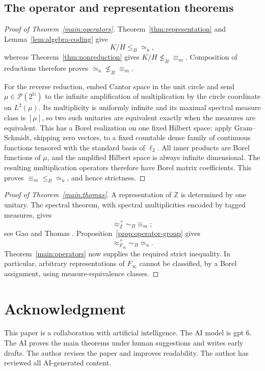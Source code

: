 \documentclass[11pt]{article}
\numberwithin{equation}{section}
\theoremstyle{definition}
\newcommand{\N}{\mathbb N}
\newcommand{\Prob}{\mathcal P}
\newcommand{\leB}{\mathrel{\leq_B}}
\newcommand{\nleB}{\mathrel{\nleq_B}}
\begin{document}
\subsection{The operator and representation theorems}
\begin{proof}[Proof of Theorem~\ref{main:operators}]
Theorem~\ref{thm:representation} and Lemma~\ref{lem:algebra-coding} give
\[
 K/H\leB{\simeq_u},
\]
whereas Theorem~\ref{thm:nonreduction} gives $K/H\nleB{\equiv_m}$.
Composition of reductions therefore proves
$ {\simeq_u}\nleB{\equiv_m}$.

For the reverse reduction, embed Cantor space in the unit circle and
send $\mu\in\Prob(2^\N)$ to the infinite amplification of multiplication
by the circle coordinate on $L^2(\mu)$. Its multiplicity is uniformly
infinite and its maximal spectral measure class is $[\mu]$, so two such
unitaries are equivalent exactly when the measures are equivalent.
This has a Borel realization on one fixed Hilbert space: apply
Gram--Schmidt, skipping zero vectors, to a fixed countable dense family
of continuous functions tensored with the standard basis of $\ell_2$.
All inner products are Borel functions of $\mu$, and the amplified
Hilbert space is always infinite dimensional. The resulting multiplication
operators therefore have Borel matrix coefficients.
This proves $ {\equiv_m}\leB{\simeq_u}$, and hence strictness.
\end{proof}

\begin{proof}[Proof of Theorem~\ref{main:thomas}]
A representation of $\mathbb Z$ is determined by one unitary.
The spectral theorem, with spectral multiplicities encoded by tagged
measures, gives
\[
 {\approx^+_{\mathbb Z}}\sim_B{\equiv_m};
\]
see Gao \cite[Section~8.5, p.~200]{Gao} and Thomas
\cite[Section~8]{Thomas}. Proposition~\ref{prop:operator-group} gives
\[
 {\approx^+_{F_\infty}}\sim_B{\simeq_u}.
\]
Theorem~\ref{main:operators} now supplies the required strict inequality.
In particular, arbitrary representations of $F_\infty$ cannot be
classified, by a Borel assignment, using measure-equivalence classes.
\end{proof}

\section*{Acknowledgment}
This paper is a collaboration with artificial intelligence. The AI model is gpt 6. The AI proves the main theorems under human suggestions and writes early drafts. The author revises the paper and improves readability. The author has reviewed all AI-generated content.
\end{document}
